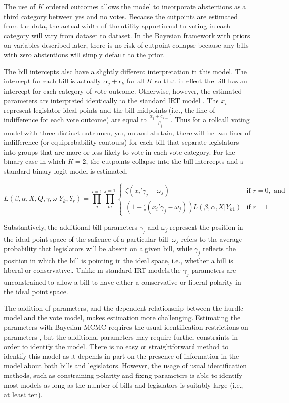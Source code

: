	The use of $K$ ordered outcomes allows the model to incorporate abstentions as a third category between yes and no votes. Because the cutpoints are estimated from the data, the actual width of the utility apportioned to voting in each category will vary from dataset to dataset. In the Bayesian framework with priors on variables described later, there is no risk of cutpoint collapse because any bills with zero abstentions will simply default to the prior.
	
	The bill intercepts also have a slightly different interpretation in this model. The intercept for each bill is actually $\alpha_j + c_k$ for all $K$ so that in effect the bill has an intercept for each category of vote outcome. Otherwise, however, the estimated parameters are interpreted identically to the standard IRT model \parencite{jackman2004}. The $x_i$ represent legislator ideal points and the bill midpoints (i.e., the line of indifference for each vote outcome) are equal to $\frac{\alpha_j + c_{k-1}}{\beta_j}$. Thus for a rollcall voting model with three distinct outcomes, yes, no and abstain, there will be two lines of indifference (or equiprobability contours) for each bill that separate legislators into groups that are more or less likely to vote in each vote category. For the binary case in which $K=2$, the cutpoints collapse into the bill intercepts and a standard binary logit model is estimated.
	
		 \[
	L(\beta,\alpha,X,Q,\gamma,\omega|Y_{k},Y_{r}) = 
	\prod_{n}^{i=1} \prod_{m}^{j=1}
	\begin{cases}
	\zeta(x_{i}'\gamma_j - \omega_j ) & \text{if } r=0, \text{ and} \\
	(1-\zeta({x_{i}'\gamma_j - \omega_j}))L(\beta,\alpha,X|Y_{k1}) & \text{if } r=1
	\end{cases}
	\]
	
	Substantively, the additional bill parameters $\gamma_j$ and $\omega_j$ represent the position in the ideal point space of the salience of a particular bill. $\omega_j$ refers to the average probability that legislators will be absent on a given bill, while $\gamma_j$ reflects the position in which the bill is pointing in the ideal space, i.e., whether a bill is liberal or conservative.. Unlike in standard IRT models,the $\gamma_j$ parameters are unconstrained to allow a bill to have either a conservative or liberal polarity in the ideal point space. 
	
	The addition of parameters, and the dependent relationship between the hurdle model and the vote model, makes estimation more challenging. Estimating the parameters with Bayesian MCMC requires the usual identification restrictions on parameters \parencite{jackman2004,gelman2005}, but the additional parameters may require further constraints in order to identify the model. There is no easy or straightforward method to identify this model as it depends in part on the presence of information in the model about both bills and legislators. However, the usage of usual identification methods, such as constraining polarity and fixing parameters is able to identify most models as long as the number of bills and legislators is suitably large (i.e., at least ten).
	
